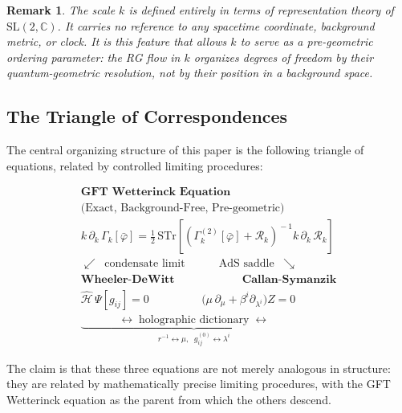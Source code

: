 \documentclass[12pt,a4paper]{article}
\newtheorem{remark}{Remark}
\newcommand{\STr}{\mathrm{STr}}
\newcommand{\Rk}{\mathcal{R}_k}
\newcommand{\Gk}{\Gamma_k}
\newcommand{\kdk}{k\,\partial_k}
\begin{document}
\begin{remark}
The scale $k$ is defined entirely in terms of representation theory of
$\mathrm{SL}(2,\mathbb{C})$.
It carries no reference to any spacetime coordinate, background metric,
or clock.
It is this feature that allows $k$ to serve as a pre-geometric ordering
parameter: the RG flow in $k$ organizes degrees of freedom by their
quantum-geometric resolution, not by their position in a background space.
\end{remark}

\subsection{The Triangle of Correspondences}

The central organizing structure of this paper is the following triangle
of equations, related by controlled limiting procedures:

\begin{equation}
\label{eq:triangle}
\begin{array}{c}
\textbf{GFT Wetterinck Equation}\\[4pt]
\text{(Exact, Background-Free, Pre-geometric)}\\[6pt]
\kdk\,\Gk[\bar\varphi] = \tfrac{1}{2}\,\STr\!\left[
\!\left(\Gk^{(2)}[\bar\varphi] + \Rk\right)^{\!-1}
\kdk\,\Rk\right]\\[18pt]
\swarrow\;\;\text{condensate limit}
\hspace{36pt}
\text{AdS saddle}\;\;\searrow\\[8pt]
\textbf{Wheeler-DeWitt}
\hspace{72pt}
\textbf{Callan-Symanzik}\\[4pt]
\hat{\mathcal{H}}\,\Psi[g_{ij}] = 0
\hspace{56pt}
\bigl(\mu\,\partial_\mu + \beta^i\partial_{\lambda^i}\bigr)Z = 0\\[12pt]
\underbrace{\hspace{40pt}
\longleftrightarrow\;\text{holographic dictionary}\;\longleftrightarrow
\hspace{40pt}}_{r^{-1}\leftrightarrow\mu,\;\;
g^{(0)}_{ij}\leftrightarrow\lambda^i}
\end{array}
\end{equation}

The claim is that these three equations are not merely analogous in
structure: they are related by mathematically precise limiting
procedures, with the GFT Wetterinck equation as the parent
from which the others descend.
\end{document}
